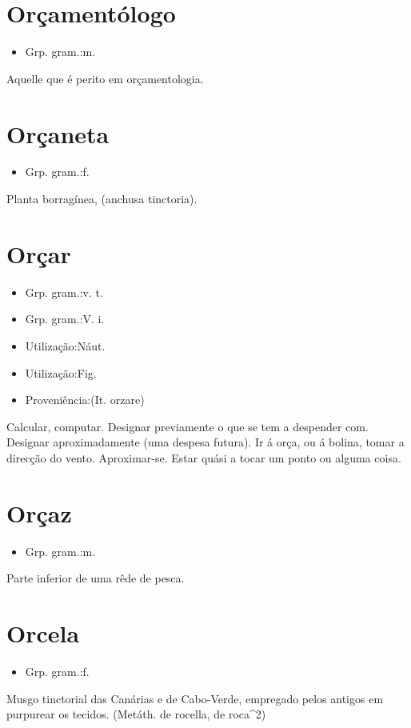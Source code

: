 \section{Orçamentólogo}
\begin{itemize}
\item {Grp. gram.:m.}
\end{itemize}
Aquelle que é perito em orçamentologia.
\section{Orçaneta}
\begin{itemize}
\item {Grp. gram.:f.}
\end{itemize}
Planta borragínea, (\textunderscore anchusa tinctoria\textunderscore ).
\section{Orçar}
\begin{itemize}
\item {Grp. gram.:v. t.}
\end{itemize}
\begin{itemize}
\item {Grp. gram.:V. i.}
\end{itemize}
\begin{itemize}
\item {Utilização:Náut.}
\end{itemize}
\begin{itemize}
\item {Utilização:Fig.}
\end{itemize}
\begin{itemize}
\item {Proveniência:(It. \textunderscore orzare\textunderscore )}
\end{itemize}
Calcular, computar.
Designar previamente o que se tem a despender com.
Designar aproximadamente (uma despesa futura).
Ir á orça, ou á bolina, tomar a direcção do vento.
Aproximar-se.
Estar quási a tocar um ponto ou alguma coisa.
\section{Orçaz}
\begin{itemize}
\item {Grp. gram.:m.}
\end{itemize}
Parte inferior de uma rêde de pesca.
\section{Orcela}
\begin{itemize}
\item {Grp. gram.:f.}
\end{itemize}
Musgo tinctorial das Canárias e de Cabo-Verde, empregado pelos antigos em purpurear os tecidos.
(Metáth. de \textunderscore rocella\textunderscore , de \textunderscore roca\textunderscore ^2)
